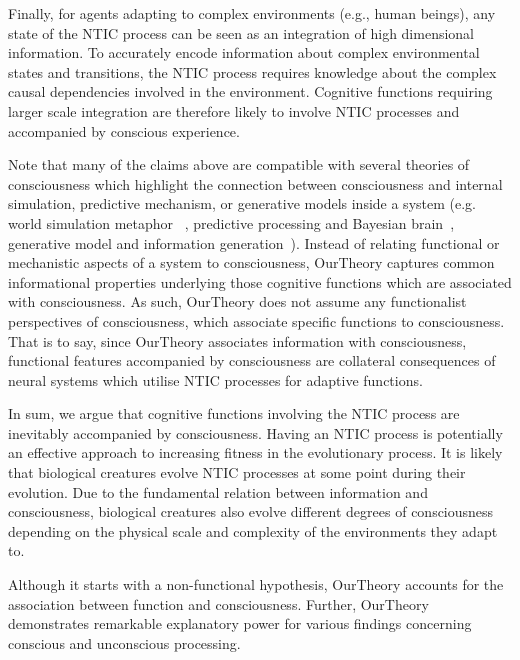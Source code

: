 \documentclass[utf8]{article}
\begin{document}
    	    Finally, for agents adapting to complex environments (e.g., human beings), any state of the NTIC process can be seen as an integration of high dimensional information. To accurately encode information about complex environmental states and transitions, the NTIC process requires knowledge about the complex causal dependencies involved in the environment. Cognitive functions requiring larger scale integration are therefore likely to involve NTIC processes and accompanied by conscious experience. %
    	    
    	    Note that many of the claims above are compatible with several theories of consciousness which highlight the connection between consciousness and internal simulation, predictive mechanism, or generative models inside a system (e.g. world simulation metaphor ~\citep{revonsuo2006inner}, predictive processing and Bayesian brain~\citep{clark_2013,Hohwy2013,seth2014predictive}, generative model and information generation~\citep{kanai_chang_yu_de_abril_biehl_guttenberg_2019}). Instead of relating functional or mechanistic aspects of a system to consciousness, \ac{OurTheory} captures common informational properties underlying those cognitive functions which are associated with consciousness. As such, \ac{OurTheory} does not assume any functionalist perspectives of consciousness, which associate specific functions to consciousness.  That is to say, since \ac{OurTheory} associates information  with consciousness, functional features accompanied by consciousness are collateral consequences of neural systems which utilise NTIC processes for adaptive functions. 
    	    
    	    In sum, we argue that cognitive functions involving the NTIC process are inevitably accompanied by consciousness. Having an NTIC process is potentially an effective approach to increasing fitness in the evolutionary process. It is likely that biological creatures evolve NTIC processes at some point during their evolution. Due to the fundamental relation between information and consciousness, biological creatures also evolve different degrees of consciousness depending on the physical scale and complexity of the environments they adapt to. 
    	    
    	    Although it starts with a non-functional hypothesis, \ac{OurTheory} accounts for the association between function and consciousness. Further, \ac{OurTheory}  demonstrates remarkable explanatory power for various findings concerning conscious and unconscious processing. 
	    
\end{document}
